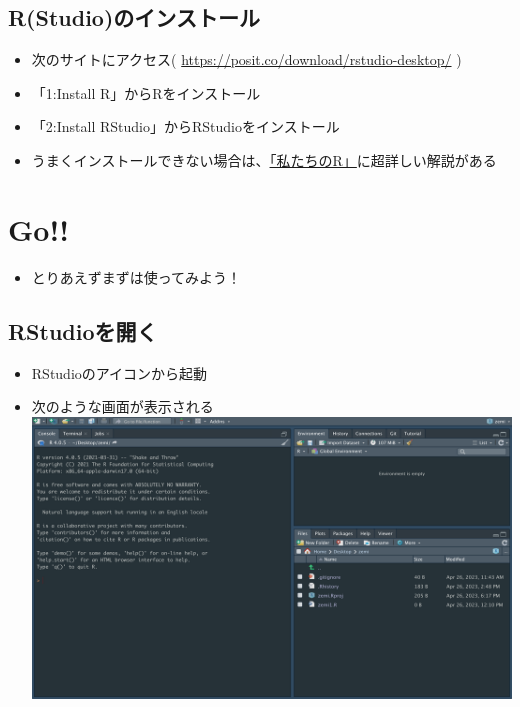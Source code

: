 \documentclass[
]{book}
\providecommand{\tightlist}{%
  \setlength{\itemsep}{0pt}\setlength{\parskip}{0pt}}
\begin{document}
\hypertarget{rstudioux306eux30a4ux30f3ux30b9ux30c8ux30fcux30eb}{%
\section{R(Studio)のインストール}\label{rstudioux306eux30a4ux30f3ux30b9ux30c8ux30fcux30eb}}

\begin{itemize}
\tightlist
\item
  次のサイトにアクセス( \url{https://posit.co/download/rstudio-desktop/} )
\item
  「1:Install R」からRをインストール
\item
  「2:Install RStudio」からRStudioをインストール
\item
  うまくインストールできない場合は、\href{https://www.jaysong.net/RBook/installation.html}{「私たちのR」}に超詳しい解説がある
\end{itemize}

\hypertarget{go}{%
\chapter{Go!!}\label{go}}

\begin{itemize}
\tightlist
\item
  とりあえずまずは使ってみよう！
\end{itemize}

\hypertarget{rstudioux3092ux958bux304f}{%
\section{RStudioを開く}\label{rstudioux3092ux958bux304f}}

\begin{itemize}
\tightlist
\item
  RStudioのアイコンから起動
\item
  次のような画面が表示される\\
  \includegraphics{./img/01_rstudio_start.png}
\end{itemize}
\end{document}
